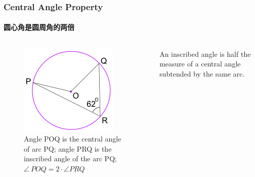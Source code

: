 \documentclass[
	11pt, %
]{beamer}
\begin{document}
\begin{frame}
\frametitle{Central Angle Property}
\framesubtitle{圆心角是圆周角的两倍}

\begin{columns}[t] 
		\begin{column}{0.4\textwidth} %
			\begin{figure}
				\includegraphics[width=\linewidth]{Central_Angle_Property.png}
				\caption{Angle POQ is the central angle of arc PQ; angle PRQ is the inscribed angle of the arc PQ;$\angle\ POQ = 2\cdot \angle PRQ$ }
			\end{figure}

		\end{column}
		\begin{column}{0.6\textwidth} %

		\begin{theorem}
			An inscribed angle is half the measure of a central angle subtended by the same arc.
		\end{theorem}
		\end{column}
	\end{columns}
\end{frame}

\end{document}
